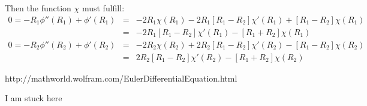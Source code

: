 \begin{itemize}
Then the function $\chi$ must fulfill:
\begin{eqnarray}
0 =-R_1\phi''(R_1) + \phi'(R_1) 
&=& - 2R_1\chi(R_1) -  2R_1[R_1-R_2] \chi'(R_1) +[R_1-R_2] \chi(R_1)  \\
&=& -  2R_1[R_1-R_2] \chi'(R_1) - [R_1+ R_2] \chi(R_1)  \\
0=-R_2\phi''(R_2) + \phi'(R_2) 
&=& - 2R_2\chi(R_2) + 2R_2[R_1-R_2] \chi'(R_2) -[R_1-R_2] \chi(R_2) \\
&=&  2R_2[R_1-R_2] \chi'(R_2) -[R_1+R_2] \chi(R_2) 
\end{eqnarray}

http://mathworld.wolfram.com/EulerDifferentialEquation.html


\end{itemize}

{\color{red} I am stuck here}








